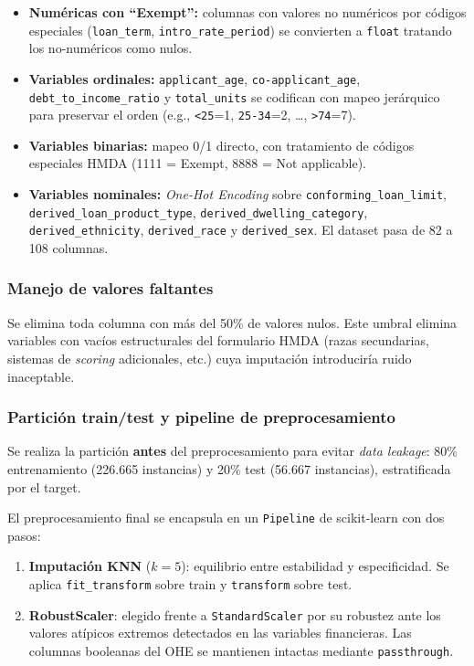 \documentclass[11pt,a4paper]{article}
\begin{document}
\begin{itemize}
    \item \textbf{Numéricas con ``Exempt'':} columnas con valores no numéricos por códigos
    especiales (\texttt{loan\_term}, \texttt{intro\_rate\_period}) se convierten a \texttt{float}
    tratando los no-numéricos como nulos.
    \item \textbf{Variables ordinales:} \texttt{applicant\_age}, \texttt{co-applicant\_age},
    \texttt{debt\_to\_income\_ratio} y \texttt{total\_units} se codifican con mapeo jerárquico
    para preservar el orden (e.g., \texttt{<25}=1, \texttt{25-34}=2, \ldots, \texttt{>74}=7).
    \item \textbf{Variables binarias:} mapeo 0/1 directo, con tratamiento de códigos especiales
    HMDA (1111 = Exempt, 8888 = Not applicable).
    \item \textbf{Variables nominales:} \textit{One-Hot Encoding} sobre \texttt{conforming\_loan\_limit},
    \texttt{derived\_loan\_product\_type}, \texttt{derived\_dwelling\_category},
    \texttt{derived\_ethnicity}, \texttt{derived\_race} y \texttt{derived\_sex}. El dataset pasa
    de 82 a 108 columnas.
\end{itemize}

\subsubsection{Manejo de valores faltantes}

Se elimina toda columna con más del 50\% de valores nulos. Este umbral elimina variables con
vacíos estructurales del formulario HMDA (razas secundarias, sistemas de \textit{scoring} adicionales,
etc.) cuya imputación introduciría ruido inaceptable.

\subsubsection{Partición train/test y pipeline de preprocesamiento}

Se realiza la partición \textbf{antes} del preprocesamiento para evitar \textit{data leakage}: 80\%
entrenamiento (226.665 instancias) y 20\% test (56.667 instancias), estratificada por el target.

El preprocesamiento final se encapsula en un \texttt{Pipeline} de scikit-learn con dos pasos:

\begin{enumerate}
    \item \textbf{Imputación KNN} ($k=5$): equilibrio entre estabilidad y especificidad. Se aplica
    \texttt{fit\_transform} sobre train y \texttt{transform} sobre test.
    \item \textbf{RobustScaler}: elegido frente a \texttt{StandardScaler} por su robustez ante
    los valores atípicos extremos detectados en las variables financieras. Las columnas booleanas
    del OHE se mantienen intactas mediante \texttt{passthrough}.
\end{enumerate}
\end{document}
